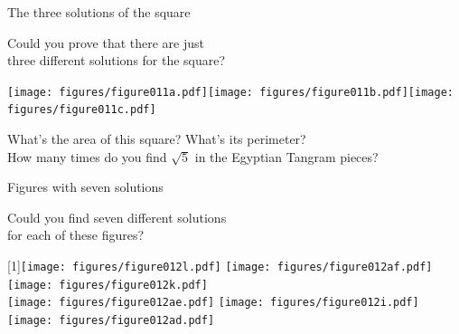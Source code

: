 \documentclass[14pt]{beamer}
\begin{document}

    \begin{frame}{The three solutions of the square}

        \vspace{-1em}
        \begin{center}
            Could you prove that there are just\\three different solutions for the square?

            \bigskip\bigskip

            \texttt{[image: figures/figure011a.pdf]}\quad\texttt{[image: figures/figure011b.pdf]}\quad\texttt{[image: figures/figure011c.pdf]} \\

            \bigskip\bigskip

            {\footnotesize What's the area of this square? What's its perimeter?\\How many times do you find $\sqrt{5}$ in the Egyptian Tangram pieces?}
        \end{center}
    \end{frame}


    \begin{frame}{Figures with seven solutions}

        \vspace{-1em}
        \begin{center}
            Could you find seven different solutions\\for each of these figures?

            \bigskip\bigskip

            \scalebox{-1}[1]{\texttt{[image: figures/figure012l.pdf]}}\qquad
            \texttt{[image: figures/figure012af.pdf]}\qquad
            \texttt{[image: figures/figure012k.pdf]}\quad\;\;\phantom{.}\\[4ex]
            \texttt{[image: figures/figure012ae.pdf]}\quad\qquad
            \texttt{[image: figures/figure012i.pdf]}\qquad\quad
            \texttt{[image: figures/figure012ad.pdf]}\\
        \end{center}
    \end{frame}

\end{document}

